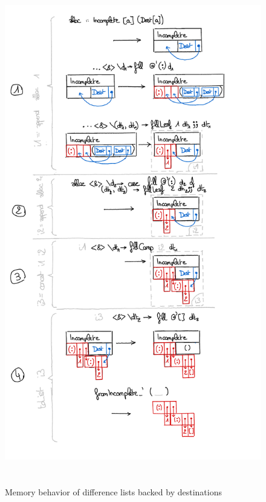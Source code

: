 \documentclass[english]{jflart}
\begin{document}
\begin{figure}[t]
\includegraphics[height=22cm]{schema-dlist.pdf}
\caption{Memory behavior of difference lists backed by destinations}
\label{fig:schema-dlist}
\end{figure}
\end{document}
